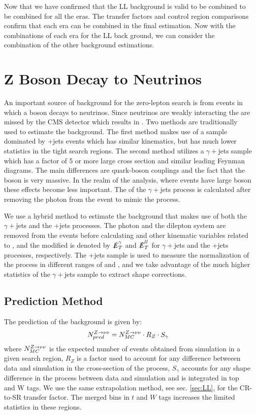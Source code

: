 Now that we have confirmed that the LL background is valid to be combined to be combined for all the eras. The transfer factors and control region comparisons confirm that each era can be combined in the final estimation. Now with the combinations of each era for the LL back ground, we can consider the combination of the other background estimations. 

\section{Z Boson Decay to Neutrinos}
\label{sec:Znunu}

An important source of background for the zero-lepton search is from events in which a \Z{} boson decays to neutrinos. Since neutrinos are weakly interacting the are missed by the CMS detector which results in \met. Two methods are traditionally used to estimate the \Znunu{} background. The first method makes use of a sample dominated by \Zll+jets events which has similar kinematics, but has much lower statistics in the tight search regions. The second method utilizes a $\gamma+$jets sample which has a factor of 5 or more large cross section and similar leading Feynman diagrams. The main differences are quark-boson couplings and the fact that the \Z{} boson is very massive. In the realm of the analysis, where events have large boson \pt{} these effects become less important. The \met{} of the $\gamma+$jets process is calculated after removing the photon from the event to mimic the \Znunu{} process.

We use a hybrid method to estimate the \Znunu{} background that makes use of both the $\gamma+$jets and the \Zll+jets processes. The photon and the dilepton system are removed from the events before calculating \met{} and other kinematic variables related to \met, and the modified \met{} is denoted by $\slashed{E}_{T}^\gamma$ and $\slashed{E}_{T}^{ll}$ for $\gamma+$jets and the \Zll+jets processes, respectively. The \Zll+jets sample is used to measure the normalization of the \Znunu{} process in different ranges of \nb{} and \nsv, and we take advantage of the much higher statistics of the $\gamma+$jets sample to extract shape corrections. 

\subsection{Prediction Method}\label{subsec:znunupred}

The prediction of the \Znunu{} background is given by:
\begin{equation}
N_{pred}^{Z\rightarrow\nu\nu}=N_{MC}^{Z\rightarrow\nu\nu} \cdot R_Z \cdot S_\gamma
\end{equation}
where $N_{MC}^{Z\rightarrow\nu\nu}$ is the expected number of \Znunu{} events obtained from simulation in a given search region, $R_Z$ is a factor used to account for any difference betweeen data and simulation in the cross-section of the \Znunu{} process, $S_\gamma$ accounts for any shape difference in the \Znunu{} process between data and simulation and is integrated in top and W tags. We use the same extrapolation method, see sec. \ref{sec:LL}, for the CR-to-SR transfer factor. The merged bins in $t$ and $W$ tags increases the limited statistics in these regions. 

